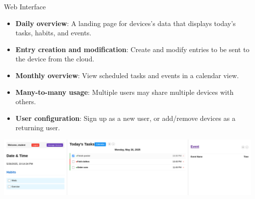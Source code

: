 \documentclass[final, cmyk]{beamer}
\newlength{\colwidth}
\begin{document}
\begin{frame}[t]
\begin{columns}[t]
\begin{column}{\colwidth}
      \begin{block}{Web Interface}
        \begin{itemize}
          \item \textbf{Daily overview}: A landing page for devices's data 
            that displays today's tasks, habits, and events.
          \item \textbf{Entry creation and modification}: Create and modify 
            entries to be sent to the device from the cloud.
          \item \textbf{Monthly overview}: View scheduled tasks and events in a
            calendar view.
          \item \textbf{Many-to-many usage}: Multiple users may share multiple
            devices with others.
          \item \textbf{User configuration}: Sign up as a new user, or
            add/remove devices as a returning user.
        \end{itemize}
        \begin{center}
          \includegraphics[width = 0.9 \textwidth]{web_mainview.png}
        \end{center}
      \end{block}


\end{column}
\end{columns}
\end{frame}
\end{document}
